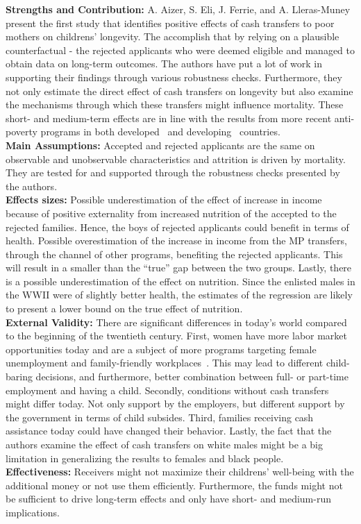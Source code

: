 \textbf{Strengths and Contribution:} A. Aizer, S. Eli, J. Ferrie, and A. Lleras-Muney present the first study that identifies positive effects of cash transfers to poor mothers on childrens' longevity. The accomplish that by relying on a plausible counterfactual - the rejected applicants who were deemed eligible and managed to obtain data on long-term outcomes. The authors have put a lot of work in supporting their findings through various robustness checks. Furthermore, they not only estimate the direct effect of cash transfers on longevity but also examine the mechanisms through which these transfers might influence mortality. These short- and medium-term effects are in line with the results from more recent anti-poverty programs in both developed~\citep{almond2011inside, hoynes2016long, dahl2012impact, milligan2011child} and developing~\citep{barham2011healthier, barham2013living} countries.\\
\textbf{Main Assumptions:} Accepted and rejected applicants are the same on observable and unobservable characteristics and attrition is driven by mortality. They are tested for and supported through the robustness checks presented by the authors.   \\
\textbf{Effects sizes:} Possible underestimation of the effect of increase in income because of positive
externality from increased nutrition of the accepted to the rejected families. Hence, the boys of rejected applicants could benefit in terms of health. Possible overestimation of the increase in income from the MP transfers, through the channel of other programs, benefiting the rejected applicants. This will result in a smaller than the ``true'' gap between the two groups. Lastly, there is a possible underestimation of the effect on nutrition. Since the enlisted males in the WWII were of slightly better health, the estimates of the regression are likely to present a lower bound on the true effect of nutrition. \\
\textbf{External Validity:} There are significant differences in today's world compared to the beginning of the twentieth century. First, women have more labor market opportunities today and are a subject of more programs targeting female unemployment and family-friendly workplaces~\citep{lauber2016helping}. This may lead to different child-baring decisions, and furthermore, better combination between full- or part-time employment and having a child. Secondly, conditions without cash transfers might differ today. Not only support by the employers, but different support by the government in terms of child subsides. Third, families receiving cash assistance today could have changed their behavior. Lastly, the fact that the authors examine the effect of cash transfers on white males might be a big limitation in generalizing the results to females and black people.\\   
\textbf{Effectiveness:} Receivers might not maximize their childrens' well-being with the additional money or not use them efficiently. Furthermore, the funds might not be sufficient to drive long-term effects and only have short- and medium-run implications. 